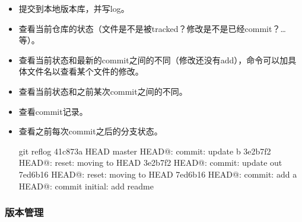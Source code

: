 \documentclass[letterpaper,10pt,english]{sphinxmanual}
\let\sphinxpxdimen\pdfpxdimen\else\newdimen\sphinxpxdimen
\begin{document}
\begin{itemize}
\item {} 
  提交到本地版本库，并写log。

\item {} 
 查看当前仓库的状态（文件是不是被tracked？修改是不是已经commit？… 等）。

\item {} 
 查看当前状态和最新的commit之间的不同（修改还没有add），命令可以加具体文件名以查看某个文件的修改。

\item {} 
 查看当前状态和之前某次commit之间的不同。

\item {} 
 查看commit记录。

\item {} 
 查看之前每次commit之后的分支状态。

%
\begin{sphinxVerbatim}[commandchars=\\\{\},numbers=left,firstnumber=1,stepnumber=1]
\PYGZdl{} git reflog
41c873a HEAD \PYGZhy{}\PYGZgt{} master HEAD@: commit: update b
3e2b7f2 HEAD@: reset: moving to HEAD
3e2b7f2 HEAD@: commit: update out
7ed6b16 HEAD@: reset: moving to HEAD
7ed6b16 HEAD@: commit: add a
 HEAD@: commit initial: add readme
\end{sphinxVerbatim}

\end{itemize}


\subsubsection{版本管理}
\label{\detokenize{git/01_localRep:id4}}
\noindent{\hspace*{\fill}\sphinxincludegraphics[width=500\sphinxpxdimen]{{01_head}.jpg}\hspace*{\fill}}
\end{document}

